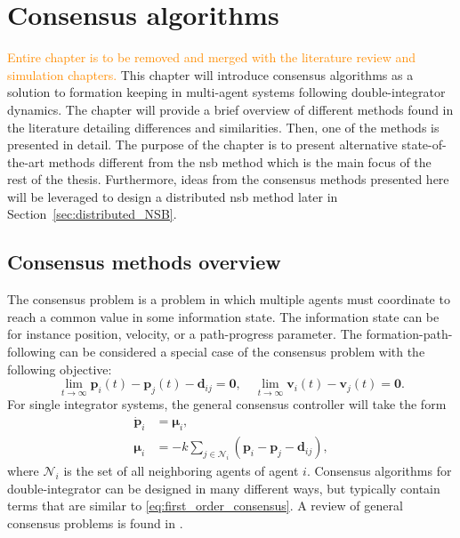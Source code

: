 \chapter{Consensus algorithms}\label{cha:consensus_algorithms}
\textcolor{DarkOrange}{Entire chapter is to be removed and merged with the literature review and simulation chapters.}
This chapter will introduce consensus algorithms as a solution to formation keeping in multi-agent systems following double-integrator dynamics. The chapter will provide a brief overview of different methods found in the literature detailing differences and similarities. Then, one of the methods is presented in detail. The purpose of the chapter is to present alternative state-of-the-art methods different from the \gls{nsb} method which is the main focus of the rest of the thesis. Furthermore, ideas from the consensus methods presented here will be leveraged to design a distributed \gls{nsb} method later in Section~\ref{sec:distributed_NSB}.



\section{Consensus methods overview}
The consensus problem is a problem in which multiple agents must coordinate to reach a common value in some information state. The information state can be for instance position, velocity, or a path-progress parameter. The formation-path-following can be considered a special case of the consensus problem with the following objective:
\begin{equation}
    \lim_{t\rightarrow\infty} \mathbf{p}_i(t) - \mathbf{p}_j(t) - \mathbf{d}_{ij} = \mathbf{0},\quad \lim_{t\rightarrow\infty} \mathbf{v}_i(t) - \mathbf{v}_j(t) = \mathbf{0}.
\end{equation}
For single integrator systems, the general consensus controller will take the form
\begin{align}\label{eq:first_order_consensus}
    \dot{\mathbf{p}}_i &= \bm{\mu}_i,\\
    \bm{\mu}_i &= -k \sum_{j\in\mathcal{N}_i}(\mathbf{p}_i-\mathbf{p}_j - \mathbf{d}_{ij}),
\end{align}
where $\mathcal{N}_i$ is the set of all neighboring agents of agent $i$. Consensus algorithms for double-integrator can be designed in many different ways, but typically contain terms that are similar to \eqref{eq:first_order_consensus}. A review of general consensus problems is found in \cite{ren_survey_2005}.


